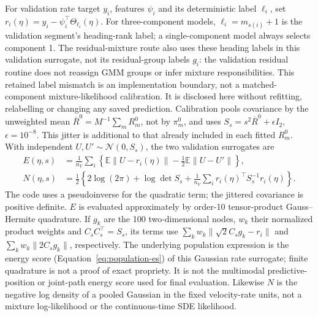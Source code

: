 \documentclass[11pt]{article}
\begin{document}
For validation rate target \(y_i\), features \(\psi_i\) and its deterministic
label \(\ell_i\), set \(r_i(\eta)=y_i-\psi_i^\top\Theta_{\ell_i}(\eta)\).
For three-component models, \(\ell_i=m_{s(i)}+1\) is the validation
segment's heading-rank label; a single-component model always selects
component 1. The residual-mixture route also uses these heading labels in
this validation surrogate, not its residual-group labels \(g_i\): the
validation residual routine does not reassign GMM groups or infer mixture
responsibilities. This retained label mismatch is an implementation boundary,
not a matched-component mixture-likelihood calibration. It is disclosed here
without refitting, relabelling or changing any saved prediction.
Calibration pools covariance by the unweighted mean
\(\overline R^0=M^{-1}\sum_mR_m^0\), not by \(\pi_m^0\), and uses
\(S_s=s^2\overline R^0+\epsilon I_2\), \(\epsilon=10^{-8}\).
This jitter is additional to that already included in each fitted \(R_m^0\).
With independent \(U,U'\sim\mathcal N(0,S_s)\), the two validation surrogates
are
\begin{equation}
\begin{aligned}
E(\eta,s)&=\frac1{n_V}\sum_i
 \left\{\mathbb E\|U-r_i(\eta)\|-\tfrac12\mathbb E\|U-U'\|\right\},\\
N(\eta,s)&=\tfrac12\left\{2\log(2\pi)+\log\det S_s
 +\frac1{n_V}\sum_i r_i(\eta)^\top S_s^{-1}r_i(\eta)\right\}.
\end{aligned}
\label{eq:estimator-validation-surrogates}
\end{equation}
The code uses a pseudoinverse for the quadratic term; the jittered covariance
is positive definite. \(E\) is evaluated approximately by order-10
tensor-product Gauss--Hermite quadrature. If \(g_k\) are the 100 two-dimensional
nodes, \(w_k\) their normalized product weights and \(C_sC_s^\top=S_s\),
its terms use \(\sum_kw_k\|\sqrt2C_sg_k-r_i\|\) and
\(\sum_kw_k\|2C_sg_k\|\), respectively.
The underlying population expression is the energy score
(Equation~\eqref{eq:population-es}) of this Gaussian rate surrogate;
finite quadrature is not a proof of exact propriety.
It is not the multimodal predictive-position or joint-path energy score
used for final evaluation. Likewise \(N\) is the negative log density of
a pooled Gaussian in the fixed velocity-rate units, not a mixture
log-likelihood or the continuous-time SDE likelihood.
\end{document}
